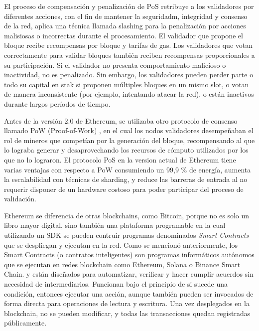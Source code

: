 El proceso de compensación y penalización de PoS retribuye a los validadores por diferentes acciones, con el fin de mantener la seguridadm, integridad y consenso de la red, aplica una técnica llamada slashing para la penalización por acciones malisiosas o incorrectas durante el procesamiento. El validador que propone el bloque recibe recompensas por bloque y tarifas de gas. Los validadores que votan correctamente para validar bloques también reciben recompensas proporcionales a su participación. Si el validador no presenta comportamiento malicioso o inactividad, no es penalizado. Sin embargo, los validadores pueden perder parte o todo su capital en stak si proponen múltiples bloques en un mismo slot, o votan de manera inconsistente (por ejemplo, intentando atacar la red), o están inactivos durante largos períodos de tiempo.

Antes de la versión 2.0 de Ethereum, se utilizaba otro protocolo de consenso llamado PoW (Proof-of-Work) \citep{PoW}, en el cual los nodos validadores desempeñaban el rol de mineros que competían por la generación del bloque, recompensando al que lo lograba generar y desaprovechando los recursos de cómputo utilizados por los que no lo lograron. El protocolo PoS en la version actual de Ethereum tiene varias ventajas con respecto a PoW consumiendo un 99,9 \% de energía, aumenta la escalabilidad con técnicas de sharding, y reduce las barreras de entrada al no requerir disponer de un hardware costoso para poder participar del proceso de validación.


Ethereum se diferencia de otras blockchains, como Bitcoin, porque no es solo un libro mayor digital, sino también una plataforma programable en la cual utilizando un SDK se pueden contruir programas denominados \textit{Smart Contracts} que se despliegan y ejecutan en la red. Como se mencionó anteriormente, los Smart Contracts (o contratos inteligentes) son programas informáticos autónomos que se ejecutan en redes blockchain como Ethereum, Solana o Binance Smart Chain. y están diseñados para automatizar, verificar y hacer cumplir acuerdos sin necesidad de intermediarios. Funcionan bajo el principio de si sucede una condición, entonces ejecutar una acción, aunque también pueden ser invocados de forma directa para operaciones de lectura y escritura. Una vez desplegados en la blockchain, no se pueden modificar, y todas las transacciones quedan registradas públicamente. 

